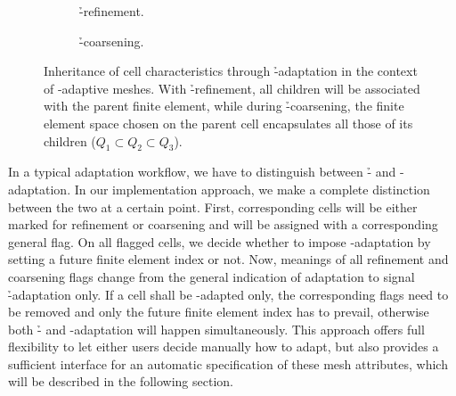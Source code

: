 \begin{figure}
\begin{subfigure}{.5\textwidth}
  \centering
  
  \caption{\h-refinement.}
\end{subfigure}
\begin{subfigure}{.5\textwidth}
  \centering
  
  \caption{\h-coarsening.}
\end{subfigure}
\caption[Inheritance of cell characteristics through \h-adaptation in the context of \hp-adaptive meshes.]{Inheritance of cell characteristics through \h-adaptation in the context of \hp-adaptive meshes. With \h-refinement, all children will be associated with the parent finite element, while during \h-coarsening, the finite element space chosen on the parent cell encapsulates all those of its children ($Q_1 \subset Q_2 \subset Q_3$).}
\label{fig:adaptation}
\end{figure}

In a typical adaptation workflow, we have to distinguish between \h- and \p-adaptation. In our implementation approach, we make a complete distinction between the two at a certain point. First, corresponding cells will be either marked for refinement or coarsening and will be assigned with a corresponding general flag. On all flagged cells, we decide whether to impose \p-adaptation by setting a future finite element index or not. Now, meanings of all refinement and coarsening flags change from the general indication of adaptation to signal \h-adaptation only. If a cell shall be \p-adapted only, the corresponding flags need to be removed and only the future finite element index has to prevail, otherwise both \h- and \p-adaptation will happen simultaneously. This approach offers full flexibility to let either users decide manually how to adapt, but also provides a sufficient interface for an automatic specification of these mesh attributes, which will be described in the following section.